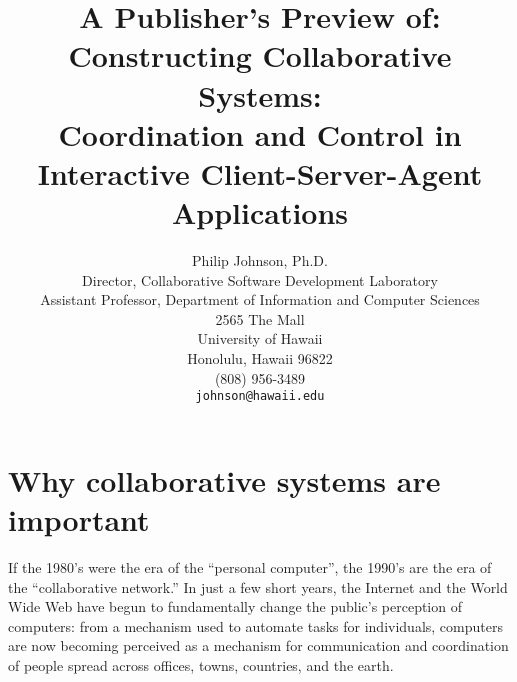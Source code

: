 \newcommand{\exercise}[4]
   {\addtocounter{exercise}{1}\par\medskip\noindent{\bf Exercise \theexercise: #1}%
   \hfill{\em Time/Size Averages: #2 min.},{\em #3 LOC}\hfill #4 \par\noindent}

\newcommand{\primersummary}[4]
   {\begin{figure}[h]
    \horizontalline \newline
    \noindent {\em Class Name:} #1 \newline
    \noindent {\em Purpose:} #2 \newline
    \noindent {\em Focal ECS facilities:} #3 \newline
    \noindent {\em Related Primer Material:} #4 \newline
    \horizontalline
    \end{figure}
    }




\title{{\bf {\rm\small A Publisher's Preview of:}\\Constructing Collaborative Systems:\\{\Large Coordination and Control
in Interactive Client-Server-Agent Applications}}}

\author{Philip Johnson, Ph.D.\\ 
        Director, Collaborative Software Development Laboratory\\
        Assistant Professor, Department of Information and Computer Sciences\\ 
        2565 The Mall\\ 
        University of Hawaii\\ 
        Honolulu, Hawaii 96822\\ 
        (808) 956-3489\\
        {\tt johnson@hawaii.edu}}

\date{}

\maketitle

\section{Why collaborative systems are important}

If the 1980's were the era of the ``personal computer'', the 1990's are the
era of the ``collaborative network.''  In just a few short years, the
Internet and the World Wide Web have begun to fundamentally change the
public's perception of computers: from a mechanism used to automate tasks
for individuals, computers are now becoming perceived as a mechanism for 
communication and coordination of people spread across offices,
towns, countries, and the earth.

